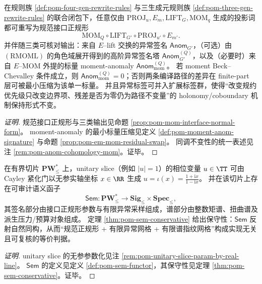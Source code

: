 \begin{conclusion}\label{con:xi-terminal-projword-normal-form-mom-twist-anom}
在规则族 \ref{def:pom-four-gen-rewrite-rules} 与三生成元规则族 \ref{def:pom-three-gen-rewrite-rules} 的联合闭包下，任意仅由
\(\mathrm{PROJ}_u,E_m,\mathrm{LIFT}_G,\mathrm{MOM}_q\)
生成的投影词都可重写为规范接口正规形
\[
\mathrm{MOM}_Q\circ \mathrm{LIFT}_{G'}\circ \mathrm{PROJ}_{u'}\circ E_{m'}.
\]
并伴随三类可核对输出：来自 \(E\)--lift 交换的异常签名 \(\mathsf{Anom}_{G'}\)，（可选）由 \((\mathrm{RMOML})\) 的角色域展开得到的高阶异常签名塔 \(\mathsf{Anom}^{(Q)}_{G'}\)，以及（必要时）来自 \(E\)--\(\mathrm{MOM}\) 外提的标量 moment-anomaly \(\mathsf{Anom}^{(Q)}_{\mathrm{mom}}\)。
若 moment Beck--Chevalley 条件成立，则 \(\mathsf{Anom}^{(Q)}_{\mathrm{mom}}=0\)；否则两条编译路径的差异在 finite-part 层可被最小压缩为该单一标量。
并且异常标签可并入扩展标签群，使得“改变规约优先级只改变边界项、残差是否为零仍为路径不变量”的 holonomy/coboundary 机制保持形式不变。
\end{conclusion}
\begin{proof}[证明]
规范接口正规形与三类输出见命题 \ref{prop:pom-mom-interface-normal-form}。
moment-anomaly 的最小标量压缩见定义 \ref{def:pom-moment-anom-signature} 与命题 \ref{prop:pom-em-mom-residual-swap}。
同调不变性的统一表述见注 \ref{rem:pom-anom-cohomology-mom}。证毕。
\end{proof}

\begin{conclusion}\label{con:xi-terminal-sem-conservative-unitary-slice}
在有界切片 \(\mathbf{PW}^{\ast}_{\le}\) 上，unitary slice（例如 \(|u|=1\)）的相位变量 \(u\in\TT\) 可由 Cayley 紧化门以无参实轴坐标 \(x\in\RR\) 生成
\(
u=\iota(x)=\frac{1+\mathrm{i}x}{1-\mathrm{i}x}
\)。
并在该切片上存在可审计语义函子
\[
\mathsf{Sem}:\mathbf{PW}^{\ast}_{\le}\longrightarrow \mathbf{Sig}_{\le}\times \mathbf{Spec}_{\le},
\]
其签名部分由接口正规形参数与有限异常采样组成，谱部分由整数矩谱、扭曲谱及派生压力/预算对象组成。
定理 \ref{thm:pom-sem-conservative} 给出保守性：\(\mathsf{Sem}\) 反射自然同构，从而“规范正规形 + 有限异常网格 + 有限谱指纹网格”构成实现无关且可复核的等价判据。
\end{conclusion}
\begin{proof}[证明]
unitary slice 的无参参数化见注 \ref{rem:pom-unitary-slice-param-by-real-line}。
\(\mathsf{Sem}\) 的定义见定义 \ref{def:pom-sem-functor}，其保守性见定理 \ref{thm:pom-sem-conservative}。证毕。
\end{proof}

